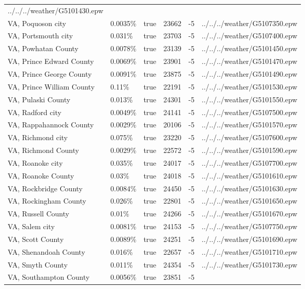 \begin{longtable}[]{@{}llllll@{}}
../../../weather/G5101430.epw \\
VA, Poquoson city & 0.0035\% & true & 23662 & -5 &
../../../weather/G5107350.epw \\
VA, Portsmouth city & 0.031\% & true & 23703 & -5 &
../../../weather/G5107400.epw \\
VA, Powhatan County & 0.0078\% & true & 23139 & -5 &
../../../weather/G5101450.epw \\
VA, Prince Edward County & 0.0069\% & true & 23901 & -5 &
../../../weather/G5101470.epw \\
VA, Prince George County & 0.0091\% & true & 23875 & -5 &
../../../weather/G5101490.epw \\
VA, Prince William County & 0.11\% & true & 22191 & -5 &
../../../weather/G5101530.epw \\
VA, Pulaski County & 0.013\% & true & 24301 & -5 &
../../../weather/G5101550.epw \\
VA, Radford city & 0.0049\% & true & 24141 & -5 &
../../../weather/G5107500.epw \\
VA, Rappahannock County & 0.0029\% & true & 20106 & -5 &
../../../weather/G5101570.epw \\
VA, Richmond city & 0.075\% & true & 23220 & -5 &
../../../weather/G5107600.epw \\
VA, Richmond County & 0.0029\% & true & 22572 & -5 &
../../../weather/G5101590.epw \\
VA, Roanoke city & 0.035\% & true & 24017 & -5 &
../../../weather/G5107700.epw \\
VA, Roanoke County & 0.03\% & true & 24018 & -5 &
../../../weather/G5101610.epw \\
VA, Rockbridge County & 0.0084\% & true & 24450 & -5 &
../../../weather/G5101630.epw \\
VA, Rockingham County & 0.026\% & true & 22801 & -5 &
../../../weather/G5101650.epw \\
VA, Russell County & 0.01\% & true & 24266 & -5 &
../../../weather/G5101670.epw \\
VA, Salem city & 0.0081\% & true & 24153 & -5 &
../../../weather/G5107750.epw \\
VA, Scott County & 0.0089\% & true & 24251 & -5 &
../../../weather/G5101690.epw \\
VA, Shenandoah County & 0.016\% & true & 22657 & -5 &
../../../weather/G5101710.epw \\
VA, Smyth County & 0.011\% & true & 24354 & -5 &
../../../weather/G5101730.epw \\
VA, Southampton County & 0.0056\% & true & 23851 & -5 &

\end{longtable}
